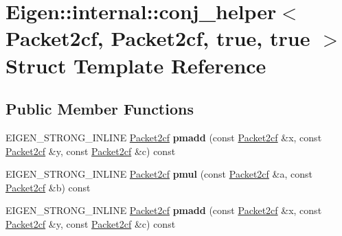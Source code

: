 \hypertarget{struct_eigen_1_1internal_1_1conj__helper_3_01_packet2cf_00_01_packet2cf_00_01true_00_01true_01_4}{}\section{Eigen\+:\+:internal\+:\+:conj\+\_\+helper$<$ Packet2cf, Packet2cf, true, true $>$ Struct Template Reference}
\label{struct_eigen_1_1internal_1_1conj__helper_3_01_packet2cf_00_01_packet2cf_00_01true_00_01true_01_4}
\subsection*{Public Member Functions}
\begin{DoxyCompactItemize}
\item 
\mbox{\label{struct_eigen_1_1internal_1_1conj__helper_3_01_packet2cf_00_01_packet2cf_00_01true_00_01true_01_4_a8bf77b0b220423fcc876b5ad49c99e61}} 
E\+I\+G\+E\+N\+\_\+\+S\+T\+R\+O\+N\+G\+\_\+\+I\+N\+L\+I\+NE \hyperlink{struct_eigen_1_1internal_1_1_packet2cf}{Packet2cf} {\bfseries pmadd} (const \hyperlink{struct_eigen_1_1internal_1_1_packet2cf}{Packet2cf} \&x, const \hyperlink{struct_eigen_1_1internal_1_1_packet2cf}{Packet2cf} \&y, const \hyperlink{struct_eigen_1_1internal_1_1_packet2cf}{Packet2cf} \&c) const
\item 
\mbox{\label{struct_eigen_1_1internal_1_1conj__helper_3_01_packet2cf_00_01_packet2cf_00_01true_00_01true_01_4_a6956a6a7b0de2fd58bd9a8ab2e3c25ae}} 
E\+I\+G\+E\+N\+\_\+\+S\+T\+R\+O\+N\+G\+\_\+\+I\+N\+L\+I\+NE \hyperlink{struct_eigen_1_1internal_1_1_packet2cf}{Packet2cf} {\bfseries pmul} (const \hyperlink{struct_eigen_1_1internal_1_1_packet2cf}{Packet2cf} \&a, const \hyperlink{struct_eigen_1_1internal_1_1_packet2cf}{Packet2cf} \&b) const
\item 
\mbox{\label{struct_eigen_1_1internal_1_1conj__helper_3_01_packet2cf_00_01_packet2cf_00_01true_00_01true_01_4_a8bf77b0b220423fcc876b5ad49c99e61}} 
E\+I\+G\+E\+N\+\_\+\+S\+T\+R\+O\+N\+G\+\_\+\+I\+N\+L\+I\+NE \hyperlink{struct_eigen_1_1internal_1_1_packet2cf}{Packet2cf} {\bfseries pmadd} (const \hyperlink{struct_eigen_1_1internal_1_1_packet2cf}{Packet2cf} \&x, const \hyperlink{struct_eigen_1_1internal_1_1_packet2cf}{Packet2cf} \&y, const \hyperlink{struct_eigen_1_1internal_1_1_packet2cf}{Packet2cf} \&c) const

\end{DoxyCompactItemize}
